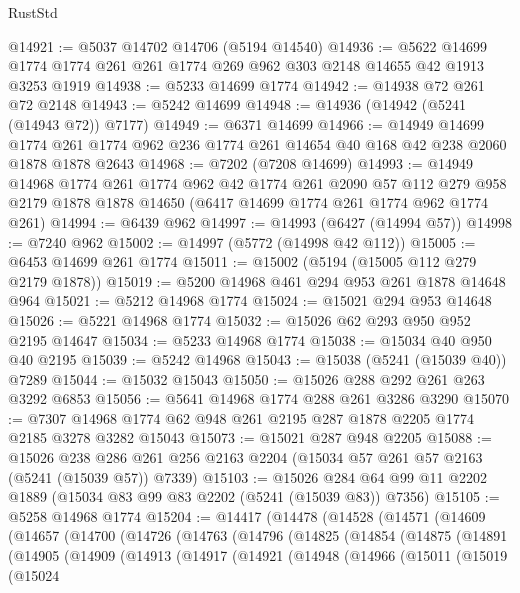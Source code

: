 \begin{lexlean}{RustStd}
\begin{coremodule}
@14921 := @5037 @14702 @14706 (@5194 @14540)
@14936 := @5622 @14699 @1774 @1774 @261 @261 @1774 @269 @962 @303 @2148 @14655 @42 @1913 @3253 @1919
@14938 := @5233 @14699 @1774
@14942 := @14938 @72 @261 @72 @2148
@14943 := @5242 @14699
@14948 := @14936 (@14942 (@5241 (@14943 @72)) @7177)
@14949 := @6371 @14699
@14966 := @14949
    @14699
    @1774
    @261
    @1774
    @962
    @236
    @1774
    @261
    @14654
    @40
    @168
    @42
    @238
    @2060
    @1878
    @1878
    @2643
@14968 := @7202 (@7208 @14699)
@14993 := @14949
    @14968
    @1774
    @261
    @1774
    @962
    @42
    @1774
    @261
    @2090
    @57
    @112
    @279
    @958
    @2179
    @1878
    @1878
    @14650
    (@6417 @14699 @1774 @261 @1774 @962 @1774 @261)
@14994 := @6439 @962
@14997 := @14993 (@6427 (@14994 @57))
@14998 := @7240 @962
@15002 := @14997 (@5772 (@14998 @42 @112))
@15005 := @6453 @14699 @261 @1774
@15011 := @15002 (@5194 (@15005 @112 @279 @2179 @1878))
@15019 := @5200 @14968 @461 @294 @953 @261 @1878 @14648 @964
@15021 := @5212 @14968 @1774
@15024 := @15021 @294 @953 @14648
@15026 := @5221 @14968 @1774
@15032 := @15026 @62 @293 @950 @952 @2195 @14647
@15034 := @5233 @14968 @1774
@15038 := @15034 @40 @950 @40 @2195
@15039 := @5242 @14968
@15043 := @15038 (@5241 (@15039 @40)) @7289
@15044 := @15032 @15043
@15050 := @15026 @288 @292 @261 @263 @3292 @6853
@15056 := @5641 @14968 @1774 @288 @261 @3286 @3290
@15070 := @7307 @14968 @1774 @62 @948 @261 @2195 @287 @1878 @2205 @1774 @2185 @3278 @3282 @15043
@15073 := @15021 @287 @948 @2205
@15088 := @15026
    @238
    @286
    @261
    @256
    @2163
    @2204
    (@15034 @57 @261 @57 @2163 (@5241 (@15039 @57)) @7339)
@15103 := @15026 @284 @64 @99 @11 @2202 @1889 (@15034 @83 @99 @83 @2202 (@5241 (@15039 @83)) @7356)
@15105 := @5258 @14968 @1774
@15204 := @14417
    (@14478
      (@14528
        (@14571
          (@14609
            (@14657
              (@14700
                (@14726
                  (@14763
                    (@14796
                      (@14825
                        (@14854
                          (@14875
                            (@14891
                              (@14905
                                (@14909
                                  (@14913
                                    (@14917
                                      (@14921
                                        (@14948
                                          (@14966
                                            (@15011
                                              (@15019
                                                (@15024

\end{coremodule}
\end{lexlean}
